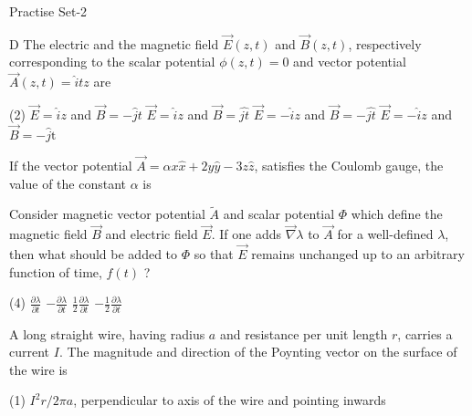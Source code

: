 \newpage
\begin{abox}
	Practise Set-2
\end{abox}
\begin{enumerate}
	\begin{minipage}{\textwidth}
		\item  D The electric and the magnetic field $\vec{E}(z, t)$ and $\vec{B}(z, t)$, respectively corresponding to the scalar potential $\phi(z, t)=0$ and vector potential $\vec{A}(z, t)=\hat{i} t z$ are
	\end{minipage}
	\begin{tasks}(2)
		\task[\textbf{A.}] $\vec{E}=\hat{i} z$ and $\vec{B}=-\hat{j} t$
		\task[\textbf{B.}]$\vec{E}=\hat{i} z$ and $\vec{B}=\hat{j t}$
		\task[\textbf{C.}]$\vec{E}=-\hat{i} z$ and $\vec{B}=-\hat{j t}$
		\task[\textbf{D.}]$\vec{E}=-\hat{i} z$ and $\vec{B}=-\hat{j} \mathrm{t}$
	\end{tasks}
	\begin{minipage}{\textwidth}
		\item If the vector potential $\vec{A}=\alpha x \hat{x}+2 y \hat{y}-3 z \hat{z}$, satisfies the Coulomb gauge, the value of the constant $\alpha$ is
	\end{minipage}
	\begin{minipage}{\textwidth}
		\item Consider magnetic vector potential $\tilde{A}$ and scalar potential $\Phi$ which define the magnetic field $\vec{B}$ and electric field $\vec{E}$. If one adds $\vec{\nabla} \lambda$ to $\vec{A}$ for a well-defined $\lambda$, then what should be added to $\Phi$ so that $\vec{E}$ remains unchanged up to an arbitrary function of time, $f(t)$ ?
	\end{minipage}
	\begin{tasks}(4)
		\task[\textbf{A.}] $\frac{\partial \lambda}{\partial t}$
		\task[\textbf{B.}]$-\frac{\partial \lambda}{\partial t}$
		\task[\textbf{C.}]$\frac{1}{2} \frac{\partial \lambda}{\partial t}$
		\task[\textbf{D.}]$-\frac{1}{2} \frac{\partial \lambda}{\partial t}$
	\end{tasks}
	\item A long straight wire, having radius $a$ and resistance per unit length $r$, carries a current $I$. The magnitude and direction of the Poynting vector on the surface of the wire is
	{}
	\begin{tasks}(1)
		\task[\textbf{A.}] $I^{2} r / 2 \pi a$, perpendicular to axis of the wire and pointing inwards

\end{tasks}
\end{enumerate}
